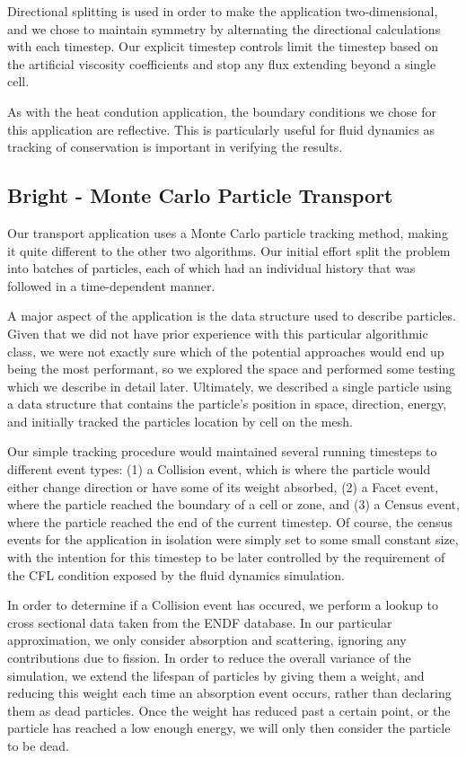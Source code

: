 \documentclass[runningheads,a4paper]{llncs}
\begin{document}
Directional splitting is used in order to make the application two-dimensional, and we chose to maintain symmetry by alternating the directional calculations with each timestep. Our explicit timestep controls limit the timestep based on the artificial viscosity coefficients and stop any flux extending beyond a single cell.

As with the heat condution application, the boundary conditions we chose for this application are reflective. This is particularly useful for fluid dynamics as tracking of conservation is important in verifying the results.

\subsection{Bright - Monte Carlo Particle Transport}

Our transport application uses a Monte Carlo particle tracking method, making it quite different to the other two algorithms. Our initial effort split the problem into batches of particles, each of which had an individual history that was followed in a time-dependent manner. 

A major aspect of the application is the data structure used to describe particles. Given that we did not have prior experience with this particular algorithmic class, we were not exactly sure which of the potential approaches would end up being the most performant, so we explored the space and performed some testing which we describe in detail later. Ultimately, we described a single particle using a data structure that contains the particle's position in space, direction, energy, and initially tracked the particles location by cell on the mesh.

Our simple tracking procedure would maintained several running timesteps to different event types: (1) a Collision event, which is where the particle would either change direction or have some of its weight absorbed, (2) a Facet event, where the particle reached the boundary of a cell or zone, and (3) a Census event, where the particle reached the end of the current timestep. Of course, the census events for the application in isolation were simply set to some small constant size, with the intention for this timestep to be later controlled by the requirement of the CFL condition exposed by the fluid dynamics simulation.

In order to determine if a Collision event has occured, we perform a lookup to cross sectional data taken from the ENDF database. In our particular approximation, we only consider absorption and scattering, ignoring any contributions due to fission. In order to reduce the overall variance of the simulation, we extend the lifespan of particles by giving them a weight, and reducing this weight each time an absorption event occurs, rather than declaring them as dead particles. Once the weight has reduced past a certain point, or the particle has reached a low enough energy, we will only then consider the particle to be dead.
\end{document}
